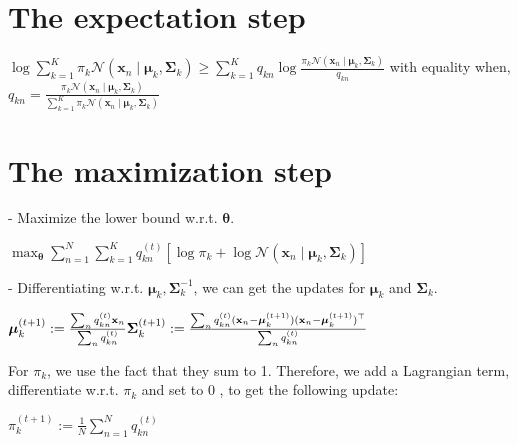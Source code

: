 \section*{The expectation step}
$\log \sum_{k=1}^{K} \pi_{k} \mathcal{N}\left(\mathbf{x}_{n} \mid \boldsymbol{\mu}_{k}, \boldsymbol{\Sigma}_{k}\right) \geq \sum_{k=1}^{K} q_{k n} \log \frac{\pi_{k} \mathcal{N}\left(\mathbf{x}_{n} \mid \boldsymbol{\mu}_{k}, \boldsymbol{\Sigma}_{k}\right)}{q_{k n}}$
with equality when,
$q_{k n}=\frac{\pi_{k} \mathcal{N}\left(\mathbf{x}_{n} \mid \boldsymbol{\mu}_{k}, \boldsymbol{\Sigma}_{k}\right)}{\sum_{k=1}^{K} \pi_{k} \mathcal{N}\left(\mathbf{x}_{n} \mid \boldsymbol{\mu}_{k}, \boldsymbol{\Sigma}_{k}\right)}$

\section*{The maximization step}
- Maximize the lower bound w.r.t. $\boldsymbol{\theta}$.

$\max _{\boldsymbol{\theta}} \sum_{n=1}^{N} \sum_{k=1}^{K} q_{k n}^{(t)}\left[\log \pi_{k}+\log \mathcal{N}\left(\mathbf{x}_{n} \mid \boldsymbol{\mu}_{k}, \boldsymbol{\Sigma}_{k}\right)\right]$

- Differentiating w.r.t. $\boldsymbol{\mu}_{k}, \boldsymbol{\Sigma}_{k}^{-1}$, we can get the updates for $\boldsymbol{\mu}_{k}$ and $\boldsymbol{\Sigma}_{k}$.

$\boldsymbol{\mu}_{k}^{(t+1)} := \frac{\sum_{n} q_{k n}^{(t)} \mathbf{x}_{n}}{\sum_{n} q_{k n}^{(t)}} 
\\ \boldsymbol{\Sigma}_{k}^{(t+1)} := \frac{\sum_{n} q_{k n}^{(t)} (\mathbf{x}_{n}-\boldsymbol{\mu}_{k}^{(t+1)})(\mathbf{x}_{n}-\boldsymbol{\mu}_{k}^{(t+1)})^{\top}}{\sum_{n} q_{k n}^{(t)}}$


For $\pi_{k}$, we use the fact that they sum to 1. Therefore, we add a Lagrangian term, differentiate w.r.t. $\pi_{k}$ and set to 0 , to get the following update:

$
\pi_{k}^{(t+1)}:=\frac{1}{N} \sum_{n=1}^{N} q_{k n}^{(t)}
$

